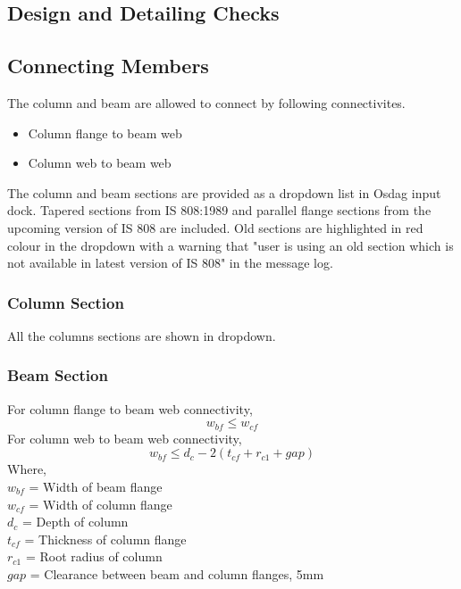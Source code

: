 \documentclass[11.5pt,a4paper,oneside]{report}
\begin{document}
\begin{Form}
\part*{Design and Detailing Checks}
\chapter{Connecting Members}
%
The column and beam are allowed to connect by following connectivites.
\begin{itemize}
	\item Column flange to beam web
	\item Column web to beam web
\end{itemize}
%
The column and beam sections are provided as a dropdown list in Osdag input dock. Tapered sections from IS 808:1989 and parallel flange sections from the upcoming version of IS 808 are included. Old sections are highlighted in red colour in the dropdown with a warning that "user is using an old section which is not available in latest version of IS 808" in the message log.
%
\section{Column Section}
%
All the columns sections are shown in dropdown.
\section{Beam Section}
%
For column flange to beam web connectivity, 
\begin{equation}
	w_{bf} \le w_{cf}
\end{equation}
%
For column web to beam web connectivity,
\begin{equation}
	w_{bf} \le d_c - 2 (t_{cf} + r_{c1} + gap)
\end{equation}
Where, \\
\indent $w_{bf}$ = Width of beam flange \\
\indent $w_{cf}$ =  Width of column flange \\
\indent $d_c$ = Depth of column \\
\indent $t_{cf}$ = Thickness of column flange \\
\indent $r_{c1}$ = Root radius of column \\
\indent $gap$ = Clearance between beam and column flanges, 5mm


\end{Form}
\end{document}
